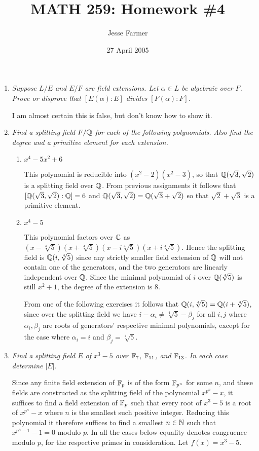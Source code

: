 \documentclass[10pt]{article}
\title{MATH 259: Homework \#4}
\author{Jesse Farmer}
\date{27 April 2005}
\begin{document}
\maketitle
\begin{enumerate}

\item \emph{Suppose $L/E$ and $E/F$ are field extensions.  Let $\alpha \in L$ be algebraic over $F$.  Prove or disprove that $[E(\alpha):E]$ divides $[F(\alpha):F]$.}

I am almost certain this is false, but don't know how to show it.

\item \emph{Find a splitting field $F/\mathbb{Q}$ for each of the following polynomials.  Also find the degree and a primitive element for each extension.}
\begin{enumerate}
\item \emph{$x^4 - 5x^2 + 6$}

This polynomial is reducible into $(x^2-2)(x^2-3)$, so that $\mathbb{Q}(\sqrt{3}, \sqrt{2})$ is a splitting field over $\mathbb{Q}$.  From previous assignments it follows that $[\mathbb{Q}(\sqrt{3}, \sqrt{2}):\mathbb{Q}] = 6$ and $\mathbb{Q}(\sqrt{3}, \sqrt{2}) = \mathbb{Q}(\sqrt{3} + \sqrt{2})$ so that $\sqrt{2}+\sqrt{3}$ is a primitive element.

\item \emph{$x^4-5$}

This polynomial factors over $\mathbb{C}$ as $(x-\sqrt[4]{5})(x+\sqrt[4]{5})(x-i\sqrt[4]{5})(x+i\sqrt[4]{5})$.  Hence the splitting field is $\mathbb{Q}(i, \sqrt[4]{5})$ since any strictly smaller field extension of $\mathbb{Q}$ will not contain one of the generators, and the two generators are linearly independent over $\mathbb{Q}$.  Since the minimal polynomial of $i$ over $\mathbb{Q}(\sqrt[4]{5})$ is still $x^2+1$, the degree of the extension is $8$.

From one of the following exercises it follows that $\mathbb{Q}(i, \sqrt[4]{5}) = \mathbb{Q}(i + \sqrt[4]{5})$, since over the splitting field we have $i - \alpha_i \neq \sqrt[4]{5} - \beta_j$ for all $i,j$ where $\alpha_i, \beta_j$ are roots of generators' respective minimal polynomials, except for the case where $\alpha_i = i$ and $\beta_j = \sqrt[4]{5}$.

\end{enumerate}

\item \emph{Find a splitting field $E$ of $x^3 - 5$ over $\mathbb{F}_7$, $\mathbb{F}_{11}$, and $\mathbb{F}_{13}$.  In each case determine $|E|$.}

Since any finite field extension of $\mathbb{F}_p$ is of the form $\mathbb{F}_{p^n}$ for some $n$, and these fields are constructed as the splitting field of the polynomial $x^{p^n} - x$, it suffices to find a field extension of $\mathbb{F}_p$ such that every root of $x^3 - 5$ is a root of $x^{p^n} - x$ where $n$ is the smallest such positive integer.  Reducing this polynomial it therefore suffices to find a smallest $n \in \mathbb{N}$ such that $x^{p^n - 1} - 1 = 0$ modulo $p$.  In all the cases below equality denotes congruence modulo $p$, for the respective primes in consideration.  Let $f(x) = x^3 - 5$.


\end{enumerate}
\end{document}
